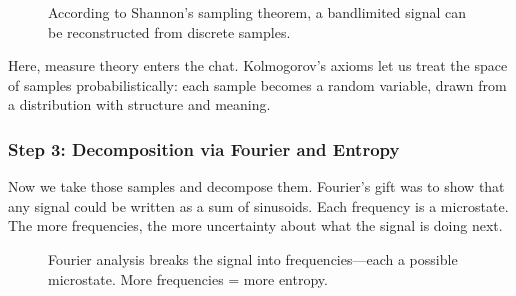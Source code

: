 \begin{figure}[H]
\centering
{}
\caption{According to Shannon’s sampling theorem, a bandlimited signal can be reconstructed from discrete samples.}
\end{figure}

Here, measure theory enters the chat. Kolmogorov’s axioms let us treat the space of samples probabilistically: each sample becomes a random variable, drawn from a distribution with structure and meaning.

\subsubsection{Step 3: Decomposition via Fourier and Entropy}
Now we take those samples and decompose them. Fourier’s gift was to show that any signal could be written as a sum of sinusoids. Each frequency is a microstate. The more frequencies, the more uncertainty about what the signal is doing next.

\begin{figure}[H]
\centering
{}
\caption{Fourier analysis breaks the signal into frequencies—each a possible microstate. More frequencies = more entropy.}
\end{figure}

